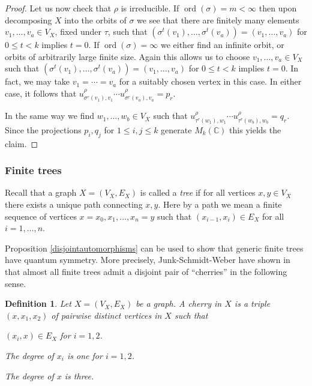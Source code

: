 \documentclass[a4paper]{amsart}
\DeclareMathOperator{\ord}{ord}
\newenvironment{bnum}
{\begin{list}{}
    {\setlength{\labelwidth}{15pt}
     \setlength{\leftmargin}{\labelwidth}
    }
}
{\end{list}}
\numberwithin{equation}{section}
\theoremstyle{change}
\newtheorem{definition}[theorem]{Definition}
\begin{document}
\begin{proof}
Let us now check that $ \rho $ is irreducible. If $ \ord(\sigma) = m < \infty $ then 
upon decomposing $ X $ into the orbits of $ \sigma $ we see that there are finitely many elements $ v_1, \dots, v_a \in V_X $, fixed under $ \tau $, 
such that $ (\sigma^t(v_1), \dots, \sigma^t(v_a)) = (v_1, \dots, v_a) $ for $ 0 \leq t < k $ implies $ t = 0 $. 
If $ \ord(\sigma) = \infty $ we either find an infinite orbit, or orbits of arbitrarily large finite size. 
Again this allows us to choose $ v_1, \dots, v_a \in V_X $ such that $ (\sigma^t(v_1), \dots, \sigma^t(v_a)) = (v_1, \dots, v_a) $ for $ 0 \leq t < k $ implies $ t = 0 $.
In fact, we may take $ v_1 = \cdots = v_a $ for a suitably chosen vertex in this case. 
In either case, it follows that $ u^\rho_{\sigma^r(v_1), v_1} \cdots u^\rho_{\sigma^r(v_a), v_a} = p_r $. 

In the same way we find $ w_1, \dots, w_b \in V_X $ such that $ u^\rho_{\tau^r(w_1), w_1} \cdots u^\rho_{\tau^r(w_b), w_b} = q_r $. 
Since the projections $ p_i, q_j $ for $ 1 \leq i,j \leq k $ generate $ M_k(\mathbb{C}) $ this yields the claim.
\end{proof} 


\subsubsection{Finite trees} 

Recall that a graph $ X = (V_X, E_X) $ is called a \emph{tree} if for all vertices $ x, y \in V_X $ there exists a unique path connecting $ x, y $. 
Here by a path we mean a finite sequence of vertices $ x = x_0, x_1, \dots, x_n = y $ such that $ (x_{i - 1}, x_i) \in E_X $ for all $ i = 1, \dots, n $. 

Proposition \ref{disjointautomorphisms} can be used to show that generic finite trees have quantum symmetry. More precisely, Junk-Schmidt-Weber have shown
in \cite{JUNK_SCHMIDT_WEBER_trees} that almost all finite trees admit a disjoint pair of ``cherries'' in the following sense. 

\begin{definition} 
Let $ X = (V_X, E_X) $ be a graph. A cherry in $ X $ is a triple $ (x, x_1, x_2) $ of pairwise distinct vertices in $ X $ such that 
\begin{bnum} 
\item[a)] $ (x_i, x) \in E_X $ for $ i = 1,2 $. 
\item[b)] The degree of $ x_i $ is one for $ i = 1,2 $. 
\item[c)] The degree of $ x $ is three. 
\end{bnum} 
\end{definition} 
\end{document}
